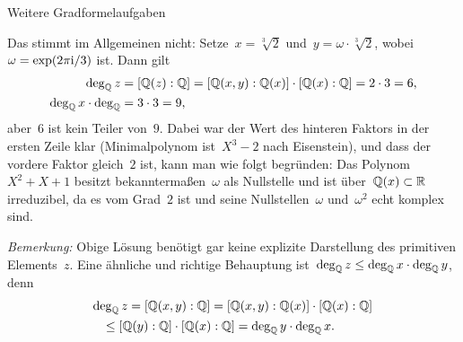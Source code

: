 \documentclass{algblatt}
\begin{document}
\begin{aufgabe}{Weitere Gradformelaufgaben}
\begin{loesungE}
\item Das stimmt im Allgemeinen nicht: Setze~$x = \sqrt[3]{2}$ und~$y = \omega
\cdot \sqrt[3]{2}$, wobei~$\omega = \exp(2\pi\mathrm{i}/3)$ ist. Dann gilt
\begin{align*}
  \deg_{\mathbb{Q}} z &= [\mathbb{Q}(z):\mathbb{Q}] = [\mathbb{Q}(x,y):\mathbb{Q}(x)] \cdot [\mathbb{Q}(x):\mathbb{Q}] = 2 \cdot 3 = 6, \\
  \deg_{\mathbb{Q}} x \cdot \deg_{\mathbb{Q}} &= 3 \cdot 3 = 9,
\end{align*}
aber~$6$ ist kein Teiler von~$9$.
Dabei war der Wert des hinteren Faktors in der ersten Zeile klar (Minimalpolynom ist~$X^3 - 2$ nach
Eisenstein), und dass der vordere Faktor gleich~$2$ ist, kann man wie folgt
begründen: Das Polynom~$X^2 + X + 1$ besitzt bekanntermaßen~$\omega$ als
Nullstelle und ist über~$\mathbb{Q}(x) \subset \mathbb{R}$ irreduzibel, da es vom Grad~$2$
ist und seine Nullstellen~$\omega$ und~$\omega^2$ echt komplex sind.

\emph{Bemerkung:} Obige Lösung benötigt gar keine explizite Darstellung des
primitiven Elements~$z$.
Eine ähnliche und richtige Behauptung ist~$\deg_{\mathbb{Q}} z \leq
\deg_{\mathbb{Q}} x \cdot \deg_{\mathbb{Q}} y$, denn
\begin{multline*}\deg_{\mathbb{Q}} z = [\mathbb{Q}(x,y):\mathbb{Q}] = [\mathbb{Q}(x,y):\mathbb{Q}(x)] \cdot
  [\mathbb{Q}(x):\mathbb{Q}] \\ \leq [\mathbb{Q}(y):\mathbb{Q}] \cdot [\mathbb{Q}(x):\mathbb{Q}] =
  \deg_{\mathbb{Q}} y \cdot \deg_{\mathbb{Q}} x. {\qquad}\end{multline*}
\end{loesungE}
\end{aufgabe}
\end{document}
